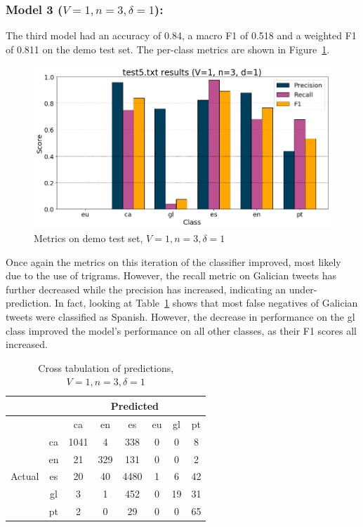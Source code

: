 \documentclass[runningheads]{llncs}
\begin{document}
\subsubsection{Model 3 ($V=1, n=3, \delta=1$): }
The third model had an accuracy of 0.84, a macro F1 of 0.518 and a weighted F1 of 0.811 on the demo test set. The per-class metrics are shown in Figure~\ref{fig:demo_1_3_1}.

\begin{figure}
    \begin{center}
        \includegraphics[width=12.5cm]{images/test5_results_1_3_1.png}
        \caption{Metrics on demo test set, $V=1, n=3, \delta=1$}
        \label{fig:demo_1_3_1}
    \end{center}
\end{figure}

Once again the metrics on this iteration of the classifier improved, most likely due to the use of trigrams. However, the recall metric on Galician tweets has further decreased while the precision has increased, indicating an under-prediction. In fact, looking at Table~\ref{tab:demo_confusion_1_3_1} shows that most false negatives of Galician tweets were classified as Spanish. However, the decrease in performance on the gl class improved the model's performance on all other classes, as their F1 scores all increased.

\begin{table}
	\centering
	\caption{Cross tabulation of predictions, $V=1, n=3, \delta=1$}
	\label{tab:demo_confusion_1_3_1}
	\begin{tabular}{|c|c|c|c|c|c|c|c|} \hline
	    & & \multicolumn{6}{c|}{Predicted} \\ \hline
		& &    ca &   en &    es &  eu &  gl &  pt \\ \hline
		\multirow{6}{*}{Actual} & ca   &  1041 &    4 &   338 &   0 &   0 &   8 \\
		& en   &    21 &  329 &   131 &   0 &   0 &   2 \\
		& es   &    20 &   40 &  4480 &   1 &   6 &  42 \\
		& gl   &     3 &    1 &   452 &   0 &  19 &  31 \\
		& pt   &     2 &    0 &    29 &   0 &   0 &  65 \\ \hline
	\end{tabular}
\end{table}
\end{document}
